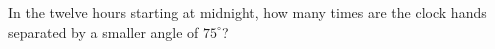 In the twelve hours starting at midnight, how many times are the clock hands separated by a smaller angle of $75^\circ$?
